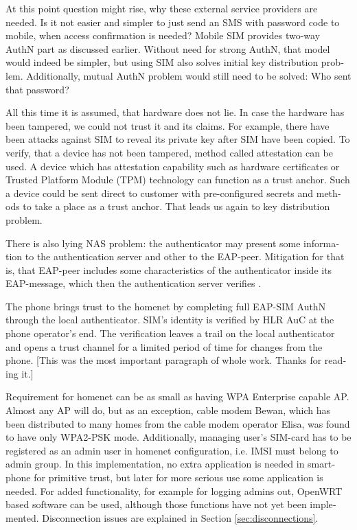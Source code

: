 \documentclass[12pt,a4paper,english]{tutthesis}
\begin{document}
\begin{otherlanguage}{english}
At this point question might rise, why these external service
providers are needed. Is it not easier and simpler to just send 
an SMS with password code to mobile, when access confirmation is needed?
Mobile SIM provides two-way AuthN part as discussed earlier.
Without need for strong AuthN, that model would indeed be 
simpler, but using SIM also solves initial key distribution problem.
Additionally, mutual AuthN problem would still need to be solved:
Who sent that password?



All this time it is assumed, that hardware does not lie. In case
the hardware has been tampered, we could not trust it and its claims.
For example, there have been attacks against SIM to reveal its private
key after SIM have been copied.  To verify, that a device has not been
tampered, method called attestation can be used.
A device which has attestation capability such as 
hardware certificates or Trusted Platform Module (TPM) technology
can function as a trust anchor.
Such a device could be sent direct to customer with pre-configured
secrets and methods to take a place as a trust anchor. 
That leads us again to key distribution problem.

There is also lying NAS problem: the authenticator may present some 
information to the authentication server and other to the EAP-peer.
Mitigation for that is, that EAP-peer includes some 
characteristics of the authenticator inside its EAP-message, which
then the authentication server verifies \cite[rfc6677]{rfc6677}.



The phone brings trust to the homenet by completing full EAP-SIM AuthN through
the local authenticator. SIM's identity is verified by HLR AuC at the phone
operator's end. The verification leaves a trail on the local authenticator and
opens a trust channel for a limited period of time for changes from the phone.
[This was the most important paragraph of whole work. Thanks for
reading it.]





Requirement for homenet can be as small as having WPA Enterprise capable
AP. Almost any AP will do, but as an exception, cable modem Bewan, which 
has been distributed to many homes from the cable modem operator Elisa, was found to have only WPA2-PSK mode.
Additionally, managing user's SIM-card has to be registered as an admin user in homenet 
configuration, i.e. IMSI must belong to admin group.
In this implementation, no extra application is needed in smartphone
for primitive trust, but later for more serious use some application is needed.
For added functionality, for example for logging admins out, OpenWRT
based software can be used, although those functions have not yet been
implemented. Disconnection issues are explained in Section
\ref{sec:disconnections}.


\end{otherlanguage}
\end{document}
